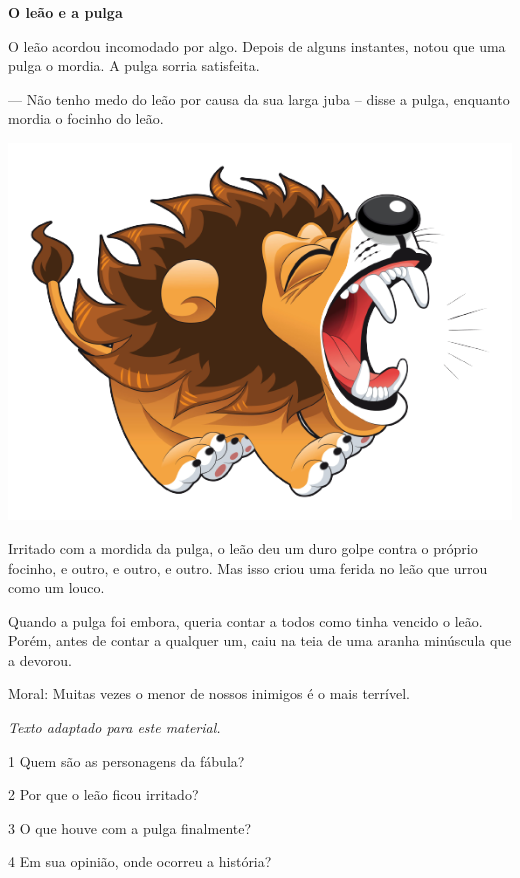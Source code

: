 \begin{myquote}
\textbf{O leão e a pulga}

O leão acordou incomodado por algo. Depois de alguns instantes, notou que uma pulga o mordia. A pulga sorria satisfeita. 

--- Não tenho medo do leão por causa da sua larga juba -- disse a pulga, enquanto mordia o focinho do leão.  

\begin{center}
\noindent\includegraphics[width=.5\textwidth]{./media/image1b.png}
\end{center}

Irritado com a mordida da pulga, o leão deu um duro golpe contra o próprio focinho, e outro, e outro, e outro. Mas isso criou uma ferida no leão que urrou como um louco.

Quando a pulga foi embora, queria contar a todos como tinha vencido o leão. Porém, antes de contar a qualquer um, caiu na teia de uma aranha minúscula que a devorou.

Moral: Muitas vezes o menor de nossos inimigos é o mais terrível.

\emph{Texto adaptado para este material.}
\end{myquote}

\num{1} Quem são as personagens da fábula?


\num{2} Por que o leão ficou irritado?


\num{3} O que houve com a pulga finalmente?


\num{4} Em sua opinião, onde ocorreu a história?


